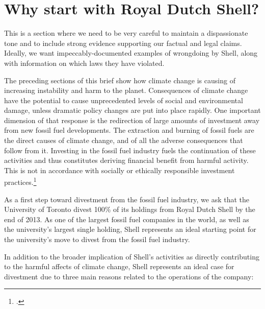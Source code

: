 

		\singlespacing
		\section{Why start with Royal Dutch Shell?}
		\label{sec:Shell}
		\doublespacing



\begin{vcom}
This is a section where we need to be very careful to maintain a dispassionate tone and to include strong evidence supporting our factual and legal claims. Ideally, we want impeccably-documented examples of wrongdoing by Shell, along with information on which laws they have violated.
\end{vcom}



The preceding sections of this brief show how climate change is causing of increasing instability and harm to the planet.
Consequences of climate change have the potential to cause unprecedented levels of social and environmental damage, unless dramatic policy changes are put into place rapidly. 
One important dimension of that response is the redirection of large amounts of investment away from new fossil fuel developments.
The extraction and burning of fossil fuels are the direct causes of climate change, and of all the adverse consequences that follow from it. 
Investing in the fossil fuel industry fuels the continuation of these activities and thus constitutes deriving financial benefit from harmful activity.
This is not in accordance with socially or ethically responsible investment practices.\footcite[][]{Richardson_2008}



As a first step toward divestment from the fossil fuel industry, we ask that the University of Toronto divest 100\% of its holdings from Royal Dutch Shell by the end of 2013. 
As one of the largest fossil fuel companies in the world, as well as the university's largest single holding, Shell represents an ideal starting point for the university's move to divest from the fossil fuel industry.
		

			
In addition to the broader implication of Shell's activities as directly contributing to the harmful affects of climate change, Shell represents an ideal case for divestment due to three main reasons  related to the operations of the company: 




